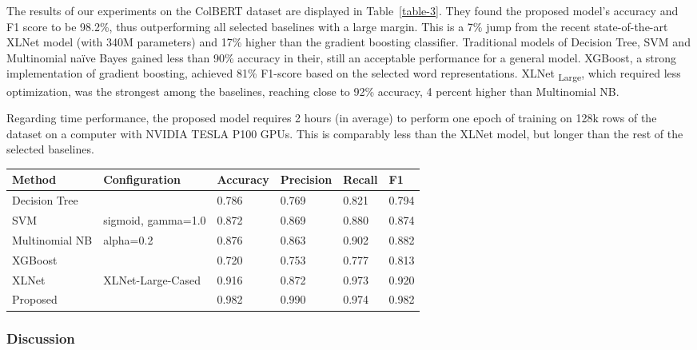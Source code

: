 \documentclass{article}
\begin{document}
The results of our experiments on the ColBERT dataset are displayed in Table~\ref{table-3}. They found the proposed model’s accuracy and F1 score to be 98.2\%, thus outperforming all selected baselines with a large margin. This is a 7\% jump from the recent state-of-the-art XLNet model (with 340M parameters) and 17\% higher than the gradient boosting classifier. Traditional models of Decision Tree, SVM and Multinomial naïve Bayes gained less than 90\% accuracy in their, still an acceptable performance for a general model. XGBoost, a strong implementation of gradient boosting, achieved 81\% F1-score based on the selected word representations. XLNet \textsubscript{Large}, which required less optimization, was the strongest among the baselines, reaching close to 92\% accuracy, 4 percent higher than Multinomial NB.

Regarding time performance, the proposed model requires 2 hours (in average) to perform one epoch of training on 128k rows of the dataset on a computer with NVIDIA TESLA P100 GPUs. This is comparably less than the XLNet model, but longer than the rest of the selected baselines.

\begin{table*}[t]
  \caption{Performance evaluation on the ColBERT Dataset}
  \label{table-3}
  \centering
  \begin{tabular}{l|p{3.4cm}llll}
  \hline
Method        & Configuration                                                                              & Accuracy & Precision & Recall & F1    \\ \hline
Decision Tree &         & 0.786  & 0.769    & 0.821     & 0.794 \\ 
SVM           & sigmoid, gamma=1.0  & 0.872    & 0.869     & 0.880  & 0.874 \\
Multinomial NB &    alpha=0.2        & 0.876  & 0.863    & 0.902     & 0.882 \\
XGBoost &         & 0.720  & 0.753    & 0.777     & 0.813 \\
XLNet           & XLNet-Large-Cased  & 0.916    & 0.872     & 0.973  & 0.920 \\
    \hline
Proposed       &  & 0.982    & 0.990     & 0.974  & 0.982 \\ \hline
\end{tabular}
\end{table*}

\subsubsection{Discussion}
\end{document}
